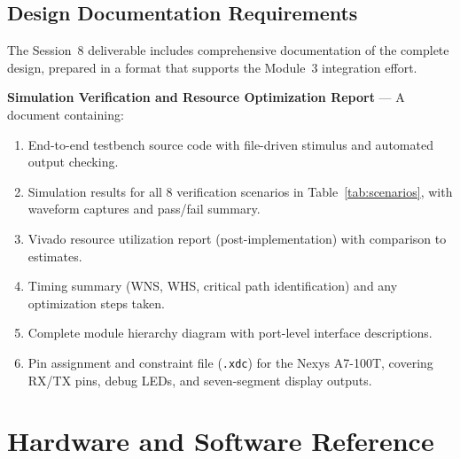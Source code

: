 \documentclass[11pt,letterpaper]{article}
\begin{document}
	\subsection{Design Documentation Requirements}

	The Session~8 deliverable includes comprehensive documentation of the complete \RTL{} design, prepared in a format that supports the Module~3 integration effort.

	\begin{tcolorbox}[deliverable={Session 8 Deliverable}]
		\textbf{Simulation Verification and Resource Optimization Report} --- A document containing:
		\begin{enumerate}
			\item End-to-end testbench \VHDL{} source code with file-driven stimulus and automated output checking.
			\item Simulation results for all 8 verification scenarios in Table~\ref{tab:scenarios}, with waveform captures and pass/fail summary.
			\item Vivado resource utilization report (post-implementation) with comparison to estimates.
			\item Timing summary (WNS, WHS, critical path identification) and any optimization steps taken.
			\item Complete \RTL{} module hierarchy diagram with port-level interface descriptions.
			\item Pin assignment and constraint file (\texttt{.xdc}) for the Nexys A7-100T, covering \UART{} RX/TX pins, debug LEDs, and seven-segment display outputs.
		\end{enumerate}
	\end{tcolorbox}

	\newpage
	\section{Hardware and Software Reference}
	\label{sec:resources}
\end{document}
